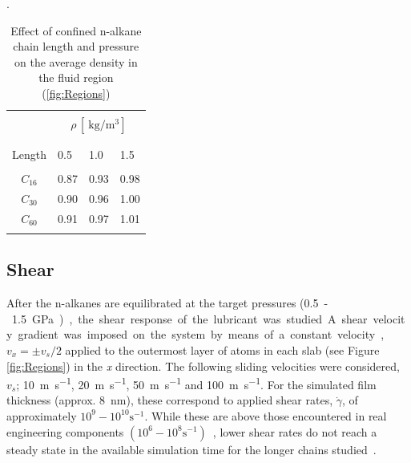 \documentclass[5p]{elsarticle}
\begin{document}
\begin{table}
	\caption{Effect of confined n-alkane chain length and pressure on the average density in the fluid region (\ref{fig:Regions})}.   
	\centering     
	\begin{tabular}{c | l l  l}
		\hline\hline\\ [-2ex]

		
										&	\multicolumn{3}{c}{ $\rho \, [\SI{}{\kilogram\per\cubic\meter}]$} \\

		\hline\\ [-2ex]
		\backslashbox{Chain \\ Length}{P $[\SI{}{\giga\pascal}]$}	&	0.5		&	1.0		&	1.5	\\

		\hline\\ [-2ex]
		$C_{16}$								&	0.87	&	0.93	&	0.98	\\
		$C_{30}$							&	0.90	&	0.96	&	1.00	\\	
		$C_{60}$								&	0.91	&	0.97	&	1.01	\\	

		\hline\hline    \\[-2ex]
	\end{tabular}
	\label{tab:rho}  
\end{table}

\subsection{Shear}

After the n-alkanes are equilibrated at the target pressures (\SI{0.5}-\SI{1.5}{\giga\pascal}), the shear response of the lubricant was studied. A shear velocity gradient was imposed on the system by means of a constant velocity, $v_x = \pm v_s/2$ applied to the outermost layer of atoms in each slab (see Figure \ref{fig:Regions}) in the \emph{x} direction. The following sliding velocities were considered, $v_s$; \SI{10}{\meter\per\second}, \SI{20}{\meter\per\second}, \SI{50}{\meter\per\second} and \SI{100}{\meter\per\second}. For the simulated film thickness (approx. \SI{8}{\nano\meter}), these correspond to applied shear rates, $\dot{\gamma}$, of approximately $10^{9} - 10^{10} \text{s}^{-1}$. While these are above those encountered in real engineering components $\left(10^{6} - 10^{8} \text{s}^{-1}\right)$~\cite{Taylor2017}, lower shear rates do not reach a steady state in the available simulation time for the longer chains studied~\cite{Ewen2018}.
\end{document}
